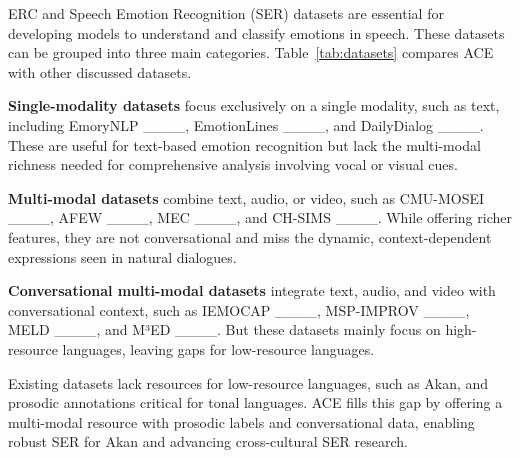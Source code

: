 ERC and Speech Emotion Recognition (SER) datasets are essential for developing models to understand and classify emotions in speech. These datasets can be grouped into three main categories. Table~\ref{tab:datasets} compares ACE with other discussed datasets.

\textbf{Single-modality datasets} focus exclusively on a single modality, such as text, including EmoryNLP ____, EmotionLines ____, and DailyDialog ____. These are useful for text-based emotion recognition but lack the multi-modal richness needed for comprehensive analysis involving vocal or visual cues.

\textbf{Multi-modal datasets} combine text, audio, or video, such as CMU-MOSEI ____, AFEW ____, MEC ____, and CH-SIMS ____. While offering richer features, they are not conversational and miss the dynamic, context-dependent expressions seen in natural dialogues.

\textbf{Conversational multi-modal datasets} integrate text, audio, and video with conversational context, such as IEMOCAP ____, MSP-IMPROV ____, MELD ____, and M³ED ____. But these datasets mainly focus on high-resource languages, leaving gaps for low-resource languages.

Existing datasets lack resources for low-resource languages, such as Akan, and prosodic annotations critical for tonal languages. ACE fills this gap by offering a multi-modal resource with prosodic labels and conversational data, enabling robust SER for Akan and advancing cross-cultural SER research. 



